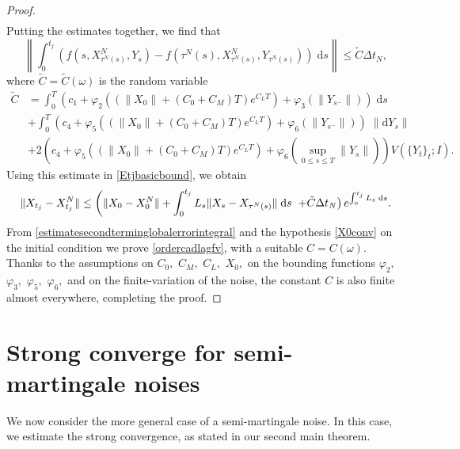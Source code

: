 \documentclass[reqno,12pt]{amsart}
\theoremstyle{plain} %
\theoremstyle{definition} %
\begin{document}
\begin{proof}
\begin{align*}
    \end{align*}
    Putting the estimates together, we find that
    \[
        \left\|\int_0^{t_j} \left( f(s, X_{\tau^N(s)}^N, Y_s) - f(\tau^N(s), X_{\tau^N(s)}^N, Y_{\tau^N(s)}) \right)\;\mathrm{d}s\right\| \leq \tilde C \Delta t_N,
    \]
    where $\tilde C=\tilde C(\omega)$ is the random variable
    \begin{equation}
        \begin{aligned}
            \tilde C & = \int_0^T \left(c_1 + \varphi_2\left(\left(\|X_0\| + (C_0 + C_M) T \right)e^{C_L T}\right) + \varphi_3(\|Y_{s^-}\|)\right)\;\mathrm{d}s \\
            & + \int_0^T \left(c_4 + \varphi_5\left(\left(\|X_0\| + (C_0 + C_M) T \right)e^{C_L T}\right) + \varphi_6(\|Y_{s^-}\|)\right)\;\|\mathrm{d}Y_s\| \\
            & + 2\left(c_4 + \varphi_5\left(\left(\|X_0\| + (C_0 + C_M) T \right)e^{C_L T}\right) + \varphi_6\left(\sup_{0\leq s \leq T}\|Y_s\|\right)\right) V(\{Y_t\}_t; I).
        \end{aligned}
    \end{equation}
    Using this estimate in \eqref{Etjbasicbound}, we obtain
    \[
        \|X_{t_j} - X_{t_j}^N\| \leq \left( \|X_0 - X_0^N\| + \int_0^{t_j} L_s\|X_s - X_{\tau^N(s)}\| \;\mathrm{d}s \right. \\
            \left. + \tilde C \Delta t_N\right) e^{\int_0^{t_j} L_s\;\mathrm{d}s}.
    \]
    From \eqref{estimatesecondterminglobalerrorintegral} and the hypothesis \eqref{X0conv} on the initial condition we prove \eqref{ordercadlagfv}, with a suitable $C=C(\omega)$. Thanks to the assumptions on $C_0,$ $C_M,$ $C_L,$ $X_0,$ on the bounding functions $\varphi_2,$ $\varphi_3,$ $\varphi_5,$ $\varphi_6,$ and on the finite-variation of the noise, the constant $C$ is also finite almost everywhere, completing the proof.
\end{proof}

\section{Strong converge for semi-martingale noises}
\label{secsubmartingale}

We now consider the more general case of a semi-martingale noise. In this case, we estimate the strong convergence, as stated in our second main theorem.
\end{document}
